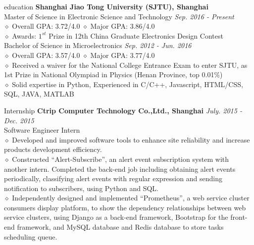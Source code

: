 \documentclass{resume} %
\begin{document}

\begin{rSection}{education}
\textbf{Shanghai Jiao Tong University (SJTU), Shanghai}
\\Master of Science in Electronic Science and Technology \hfill \emph{Sep. 2016 - Present}
\\$\diamond$ Overall GPA: 3.72/4.0 \qquad  \qquad \qquad $\diamond$ Major GPA: 3.86/4.0
\\$\diamond$ Awards: $1^{st}$ Prize in 12th China Graduate Electronics Design Contest
\\Bachelor of Science in Microelectronics \hfill \emph{Sep. 2012 - Jun. 2016}
\\$\diamond$ Overall GPA: 3.57/4.0  \qquad  \qquad \qquad $\diamond$ Major GPA: 3.77/4.0
\\$\diamond$ Received a waiver for the National College Entrance Exam to enter SJTU, as 1st Prize in National Olympiad in Physics (Henan Province, top 0.01$\%$)
\\$\diamond$ Solid expertise in Python, Experienced in C/C++, Javascript, HTML/CSS, SQL, JAVA, MATLAB
\end{rSection}


\begin{rSection}{Internship}
\textbf{Ctrip Computer Technology Co.,Ltd., Shanghai} \hfill \emph{July. 2015 - Dec. 2015}
\\Software Engineer Intern
\\$\diamond$ Developed and improved software tools to enhance site reliability and increase products development efficiency.
\\$\diamond$ Constructed ``Alert-Subscribe'', an alert event subscription system with another intern. Completed the back-end job including obtaining alert events periodically, classifying alert events with regular expression and sending notification to subscribers, using Python and SQL.
\\$\diamond$ Independently designed and implemented ``Prometheus'', a web service cluster consumers display platform, to show the dependency relationships between web service clusters, using Django as a back-end framework, Bootstrap for the front-end framework, and MySQL database and Redis database to store tasks scheduling queue.
\end{rSection}
\end{document}
